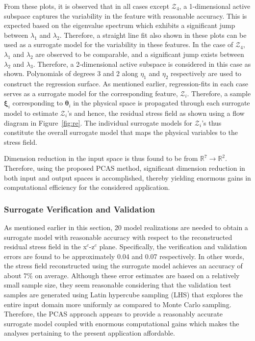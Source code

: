 %
From these plots, it is observed that in all cases except $\mathcal{Z}_4$, a 1-dimensional active
subspace captures the variability in the feature with reasonable accuracy. This is expected based on the
eigenvalue spectrum which exhibits a significant jump between $\lambda_1$ and $\lambda_2$. 
Therefore, a straight line fit also shown in these plots can be used as a surrogate model for the variability in
these features. In the case of $\mathcal{Z}_4$, $\lambda_1$ and $\lambda_2$ are observed to be comparable, and
a significant jump exists between $\lambda_2$ and $\lambda_3$. Therefore, a 2-dimensional active
subspace is considered in this case as shown. Polynomials of degrees 3 and 2 along $\eta_1$ and
$\eta_2$ respectively are used to construct the regression surface. As mentioned earlier,
regression-fits in each case
serves as a surrogate model for the corresponding feature, $\mathcal{Z}_i$. Therefore, a sample $\bm{\xi}_i$
corresponding to $\bm{\theta}_i$ in the physical space is propagated through each surrogate model to estimate
$\mathcal{Z}_i$'s and hence, the residual stress field as shown using a flow diagram in Figure~\ref{fig:re}.
The individual surrogate models for $\mathcal{Z}_i$'s thus constitute the overall surrogate model that maps the 
physical variables to the stress field. 

Dimension reduction in the input space is thus found to be from $\mathbb{R}^7\rightarrow\mathbb{R}^2$.
Therefore, using the proposed PCAS method, significant dimension reduction in both input and output
spaces is accomplished, thereby yielding enormous gains in computational efficiency for the considered application.

\subsubsection{Surrogate Verification and Validation}
\label{subsub:vnv}

As mentioned earlier in this section, 20 model realizations are needed to obtain a surrogate model with
reasonable accuracy with respect to the reconstructed residual stress field in the x$^c$-z$^c$ plane. 
Specifically, the verification and validation errors are found to be approximately 0.04 and 
0.07 respectively. In other words, the stress field reconstructed using the
surrogate model achieves an accuracy of about 7$\%$ on average. Although these error estimates
are based on a relatively small sample size, they seem reasonable considering that the validation test samples
are generated using Latin hypercube sampling (LHS) that explores the entire input domain more uniformly
as compared to Monte Carlo sampling. Therefore, the PCAS approach appears to provide a reasonably 
accurate surrogate model coupled with enormous computational gains which makes the analyses pertaining to
the present application affordable. 

